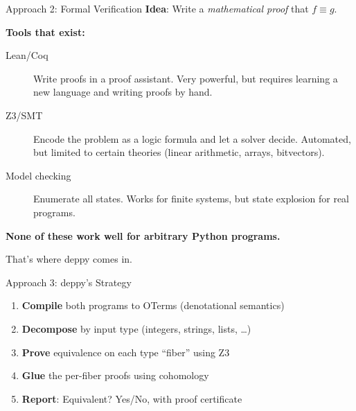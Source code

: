 \documentclass[aspectratio=169,11pt]{beamer}
\begin{document}
\begin{frame}{Approach 2: Formal Verification}
\textbf{Idea}: Write a \emph{mathematical proof} that $f \equiv g$.

\vspace{0.5em}
\textbf{Tools that exist:}
\begin{description}
\item[Lean/Coq] Write proofs in a proof assistant. Very powerful,
  but requires learning a new language and writing proofs by hand.
\item[Z3/SMT] Encode the problem as a logic formula and let a solver
  decide. Automated, but limited to certain theories (linear arithmetic,
  arrays, bitvectors).
\item[Model checking] Enumerate all states. Works for finite systems,
  but state explosion for real programs.
\end{description}

\vspace{0.5em}
\textbf{None of these work well for arbitrary Python programs.}

That's where deppy comes in.
\end{frame}

\begin{frame}{Approach 3: deppy's Strategy}
\begin{enumerate}
\item \textbf{Compile} both programs to OTerms (denotational semantics)
\item \textbf{Decompose} by input type (integers, strings, lists, \ldots)
\item \textbf{Prove} equivalence on each type ``fiber'' using Z3
\item \textbf{Glue} the per-fiber proofs using cohomology
\item \textbf{Report}: Equivalent? Yes/No, with proof certificate
\end{enumerate}

\begin{center}
\end{center}
\end{frame}
\end{document}
